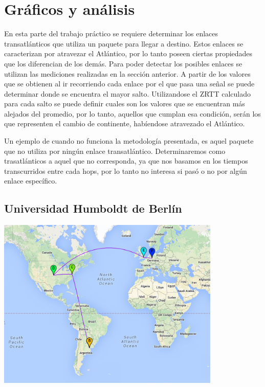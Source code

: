 \section{Gráficos y análisis}

En esta parte del trabajo práctico se requiere determinar los enlaces transatlánticos que utiliza un paquete para llegar a destino. Estos enlaces se caracterizan por atravezar el Atlántico, por lo tanto poseen ciertas propiedades que los diferencian de los demás. Para poder detectar los posibles enlaces se utilizan las mediciones realizadas en la sección anterior. A partir de los valores que se obtienen al ir recorriendo cada enlace por el que pasa una señal se puede determinar donde se encuentra el mayor salto.
Utilizandose el ZRTT calculado para cada salto se puede definir cuales son los valores que se encuentran más alejados del promedio, por lo tanto, aquellos que cumplan esa condición, serán los que representen el cambio de continente, habíendose atravezado el Atlántico.

Un ejemplo de cuando no funciona la metodología presentada, es aquel paquete que no utiliza por ningún enlace transatlántico. Determinaremos como trasatlánticos a aquel que no corresponda, ya que nos basamos en los tiempos transcurridos entre cada hops, por lo tanto no interesa si pasó o no por algún enlace específico.

\subsection{Universidad Humboldt de Berlín}
\centerline{\includegraphics[width=0.8\textwidth]{mapas/Alemania.jpeg}}

